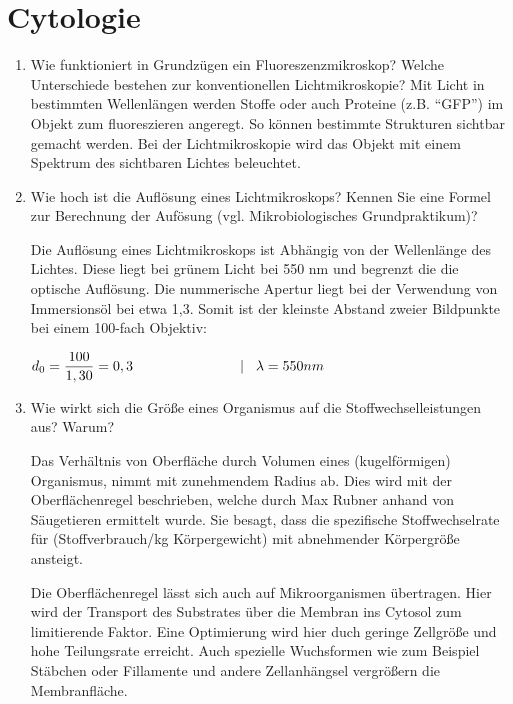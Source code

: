 
\section{Cytologie}
\label{sec:cytologie}
	\begin{enumerate}
		\item Wie funktioniert in Grundzügen ein Fluoreszenzmikroskop? Welche Unterschiede bestehen zur konventionellen Lichtmikroskopie?				
			Mit Licht in bestimmten Wellenlängen werden Stoffe
			oder auch Proteine (z.B. ``GFP'') im Objekt zum	fluoreszieren angeregt.
			So können bestimmte Strukturen sichtbar gemacht werden.
			Bei der Lichtmikroskopie wird das Objekt mit einem Spektrum des sichtbaren Lichtes
			beleuchtet.

		\item\label{tab:quest_cyt_resolution} Wie hoch ist die Auflösung eines Lichtmikroskops?
			Kennen Sie eine Formel zur Berechnung der Aufösung (vgl. Mikrobiologisches Grundpraktikum)?

		Die Auflösung eines Lichtmikroskops ist Abhängig von der Wellenlänge des Lichtes.
		Diese liegt bei grünem Licht bei 550 nm und begrenzt die die optische Auflösung.
		Die nummerische Apertur liegt bei der Verwendung von Immersionsöl bei etwa 1,3.
		Somit ist der kleinste Abstand zweier Bildpunkte bei einem 100-fach Objektiv:

		\begin{center}
		\begin{math}
			d_{0} = \dfrac{100}{1,30} = 0,3 \hspace{27mm} |\hspace{3mm} \lambda = 550 nm
		\end{math}
		\end{center}

		\item Wie wirkt sich die Größe eines Organismus auf die Stoffwechselleistungen aus? Warum?
			
			Das Verhältnis von Oberfläche durch Volumen eines (kugelförmigen) Organismus,
			nimmt mit zunehmendem Radius ab.
			Dies wird mit der Oberflächenregel beschrieben, welche durch Max Rubner anhand von Säugetieren ermittelt wurde.
			Sie besagt, dass die spezifische Stoffwechselrate für (Stoffverbrauch/kg Körpergewicht)
			mit abnehmender Körpergröße ansteigt.

			Die Oberflächenregel lässt sich auch auf Mikroorganismen übertragen.
			Hier wird der Transport des Substrates über die Membran ins Cytosol zum limitierende Faktor.
			Eine Optimierung wird hier duch geringe Zellgröße und hohe Teilungsrate erreicht.
			Auch spezielle Wuchsformen wie zum Beispiel Stäbchen
			oder Fillamente und andere Zellanhängsel vergrößern die Membranfläche.


\end{enumerate}
